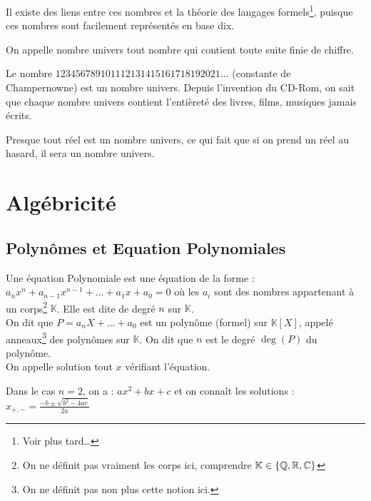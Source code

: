 \documentclass{cours}
\renewcommand*{\K}{\mathbb{K}}
\begin{document}
    Il existe des liens entre ces nombres et la théorie des langages formels\footnote{Voir plus tard\dots}, puisque ces nombres sont \og facilement \fg représentés en base dix.    

    \begin{definition}
        On appelle nombre univers tout nombre qui contient toute suite finie de chiffre.
    \end{definition}

    \begin{proposition}
        Le nombre $123456789101112131415161718192021\ldots$ (constante de Champernowne) est un nombre univers. Depuis l'invention du CD-Rom, on sait que chaque nombre univers contient l'entièreté des livres, films, musiques jamais écrits.
    \end{proposition}
    \begin{proposition}
        Presque tout réel est un nombre univers, ce qui fait que si on prend un réel au hasard, il sera un nombre univers.
    \end{proposition}

    \section{Algébricité}
    \subsection{Polynômes et Equation Polynomiales}
    \begin{definition}
        Une équation Polynomiale est une équation de la forme : $a_{n}x^{n} + a_{n-1}x^{n-1} + \ldots + a_{1}x + a_{0} = 0$ où les $a_{i}$ sont des nombres appartenant à un corps\footnote{On ne définit pas vraiment les corps ici, comprendre $\K \in \left\{\Q, \R, \C\right\}$} $\K$. Elle est dite de degré $n$ sur $\K$. \\ 
        On dit que $P = a_{n}X + \ldots + a_{0}$ est un polynôme (formel) sur $\K\left[X\right]$, appelé anneaux\footnote{On ne définit pas non plus cette notion ici.} des polynômes sur $\K$. On dit que $n$ est le degré $\deg(P)$ du polynôme.\\
        On appelle solution tout $x$ vérifiant l'équation.
    \end{definition}   
    
    \begin{proposition}
        Dans le cas $n = 2$, on a : $ax^{2} + bx + c$ et on connaît les solutions : $x_{+, -} = \frac{-b \pm \sqrt{b^{2} - 4ac}}{2a}$
    \end{proposition}
\end{document}
